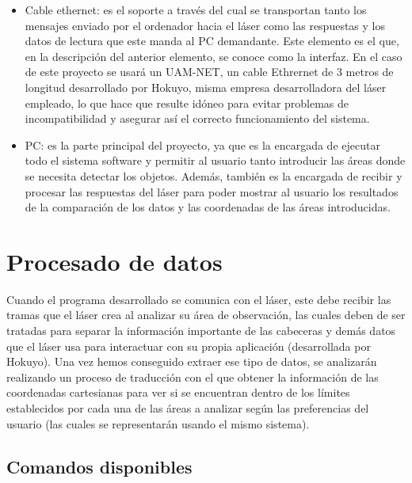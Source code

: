\begin{itemize}
    \item Cable ethernet: es el soporte a través del cual se transportan tanto los mensajes enviado por el ordenador hacia el láser como las respuestas y los datos de lectura que este manda al PC demandante. Este elemento es el que, en la descripción del anterior elemento, se conoce como la interfaz. En el caso de este proyecto se usará un UAM-NET, un cable Ethrernet de 3 metros de longitud desarrollado por Hokuyo, misma empresa desarrolladora del láser empleado, lo que hace que resulte idóneo para evitar problemas de incompatibilidad y asegurar así el correcto funcionamiento del sistema.
    \item PC: es la parte principal del proyecto, ya que es la encargada de ejecutar todo el sistema software y permitir al usuario tanto introducir las áreas donde se necesita detectar los objetos. Además, también es la encargada de recibir y procesar las respuestas del láser para poder mostrar al usuario los resultados de la comparación de los datos y las coordenadas de las áreas introducidas.\\ 
\end{itemize}

\section{Procesado de datos}

Cuando el programa desarrollado se comunica con el láser, este debe recibir las tramas que el láser crea al analizar su área de observación, las cuales deben de ser tratadas para separar la información importante de las cabeceras y demás datos que el láser usa para interactuar con su propia aplicación (desarrollada por Hokuyo). Una vez hemos conseguido extraer ese tipo de datos, se analizarán realizando un proceso de traducción con el que obtener la información de las coordenadas cartesianas para ver si se encuentran dentro de los límites establecidos por cada una de las áreas a analizar según las preferencias del usuario (las cuales se representarán usando el mismo sistema).\\

\subsection{Comandos disponibles}

